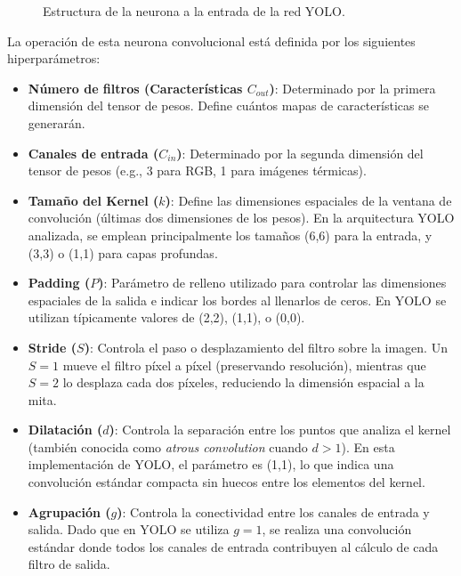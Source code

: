 \documentclass{article}
\begin{document}
\begin{figure}[H]
{
		} %
		\caption{Estructura de la neurona a la entrada de la red YOLO.}
		\label{fig:neuronaInit}
	\end{figure}
	\newpage
	La operación de esta neurona convolucional está definida por los siguientes hiperparámetros:
	\begin{itemize}
		\item \textbf{Número de filtros (Características \(C_{out}\))}: Determinado por la primera dimensión del tensor de pesos. Define cuántos mapas de características se generarán.
		\item \textbf{Canales de entrada ($C_{in}$)}: Determinado por la segunda dimensión del tensor de pesos (e.g., 3 para RGB, 1 para imágenes térmicas).
		\item \textbf{Tamaño del Kernel ($k$)}: Define las dimensiones espaciales de la ventana de convolución (últimas dos dimensiones de los pesos). En la arquitectura YOLO analizada, se emplean principalmente los tamaños (6,6) para la entrada, y (3,3) o (1,1) para capas profundas.
		\item \textbf{Padding ($P$)}: Parámetro de relleno utilizado para controlar las dimensiones espaciales de la salida e indicar los bordes al llenarlos de ceros. En YOLO se utilizan típicamente valores de (2,2), (1,1), o (0,0).
		\item \textbf{Stride ($S$)}: Controla el paso o desplazamiento del filtro sobre la imagen. Un $S=1$ mueve el filtro píxel a píxel (preservando resolución), mientras que $S=2$ lo desplaza cada dos píxeles, reduciendo la dimensión espacial a la mita.
		\item \textbf{Dilatación ($d$)}: Controla la separación entre los puntos que analiza el kernel (también conocida como \textit{atrous convolution} cuando $d > 1$). En esta implementación de YOLO, el parámetro es (1,1), lo que indica una convolución estándar compacta sin huecos entre los elementos del kernel.
		\item \textbf{Agrupación ($g$)}: Controla la conectividad entre los canales de entrada y salida. Dado que en YOLO se utiliza $g=1$, se realiza una convolución estándar donde todos los canales de entrada contribuyen al cálculo de cada filtro de salida.
	\end{itemize}
	
\end{document}
